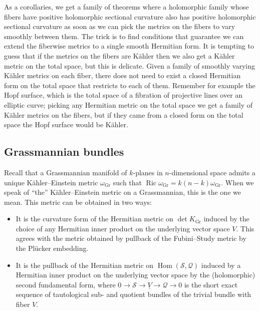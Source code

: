 \documentclass[10pt,a4paper]{amsart}
\theoremstyle{definition}
\newcommand{\cc}[1]{\mathcal{#1}}
\DeclareMathOperator{\Ric}{Ric}
\DeclareMathOperator{\Gr}{Gr}
\DeclareMathOperator{\Hom}{Hom}
\begin{document}
As a corollaries, we get a family of theorems where a holomorphic family whose fibers have positive holomorphic sectional curvature also has positive holomorphic sectional curvature as soon as we can pick the metrics on the fibers to vary smoothly between them.
The trick is to find conditions that guarantee we can extend the fiberwise metrics to a single smooth Hermitian form.
It is tempting to guess that if the metrics on the fibers are K\"ahler then we also get a K\"ahler metric on the total space, but this is delicate.
Given a family of smoothly varying K\"ahler metrics on each fiber, there does not need to exist a closed Hermitian form on the total space that restricts to each of them.
Remember for example the Hopf surface, which is the total space of a fibration of projective lines over an elliptic curve; picking any Hermitian metric on the total space we get a family of K\"ahler metrics on the fibers, but if they came from a closed form on the total space the Hopf surface would be K\"ahler.




\subsection*{Grassmannian bundles}



Recall that a Grassmannian manifold of $k$-planes in $n$-dimensional space admits a unique K\"ahler--Einstein metric $\omega_{\Gr}$ such that
$\Ric \omega_{\Gr} = k(n-k) \omega_{\Gr}$.
When we speak of ``the'' K\"ahler--Einstein metric on a Grassmannian, this is the one we mean.
This metric can be obtained in two ways:

\begin{itemize}
  \item It is the curvature form of the Hermitian metric on $\det K_{\Gr}$ induced by the choice of any Hermitian inner product on the underlying vector space $V$. This agrees with the metric obtained by pullback of the Fubini--Study metric by the Pl\"ucker embedding.

  \item It is the pullback of the Hermitian metric on $\Hom(\cc S, \cc Q)$ induced by a Hermitian inner product on the underlying vector space by the (holomorphic) second fundamental form, where $0 \to \cc S \to \underline {V} \to \cc Q \to 0$ is the short exact sequence of tautological sub- and quotient bundles of the trivial bundle with fiber $V$.
\end{itemize}
\end{document}
